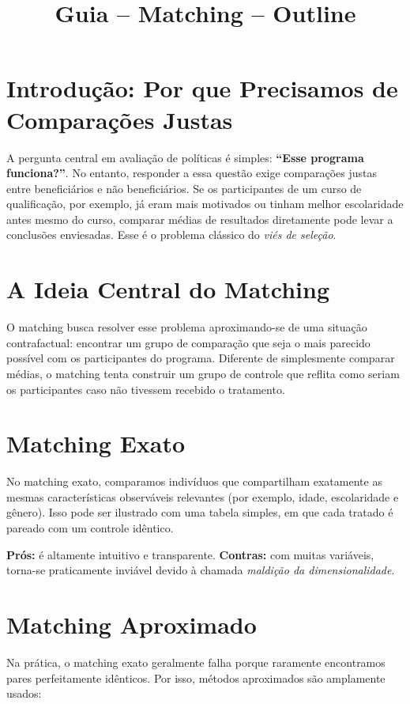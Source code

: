 \documentclass[12pt]{article}
\title{Guia -- Matching -- Outline}
\author{}
\date{}
\begin{document}
\maketitle
\doublespacing

\section{Introdução: Por que Precisamos de Comparações Justas}
A pergunta central em avaliação de políticas é simples: \textbf{``Esse programa funciona?''}. 
No entanto, responder a essa questão exige comparações justas entre beneficiários e não beneficiários. 
Se os participantes de um curso de qualificação, por exemplo, já eram mais motivados ou tinham melhor escolaridade antes mesmo do curso, comparar médias de resultados diretamente pode levar a conclusões enviesadas. 
Esse é o problema clássico do \textit{viés de seleção}.

\section{A Ideia Central do Matching}
O matching busca resolver esse problema aproximando-se de uma situação contrafactual: encontrar um grupo de comparação que seja o mais parecido possível com os participantes do programa. 
Diferente de simplesmente comparar médias, o matching tenta construir um grupo de controle que reflita como seriam os participantes caso não tivessem recebido o tratamento.

\section{Matching Exato}
No matching exato, comparamos indivíduos que compartilham exatamente as mesmas características observáveis relevantes (por exemplo, idade, escolaridade e gênero). 
Isso pode ser ilustrado com uma tabela simples, em que cada tratado é pareado com um controle idêntico.  

\textbf{Prós:} é altamente intuitivo e transparente.  
\textbf{Contras:} com muitas variáveis, torna-se praticamente inviável devido à chamada \textit{maldição da dimensionalidade}.

\section{Matching Aproximado}
Na prática, o matching exato geralmente falha porque raramente encontramos pares perfeitamente idênticos. 
Por isso, métodos aproximados são amplamente usados:
\end{document}
